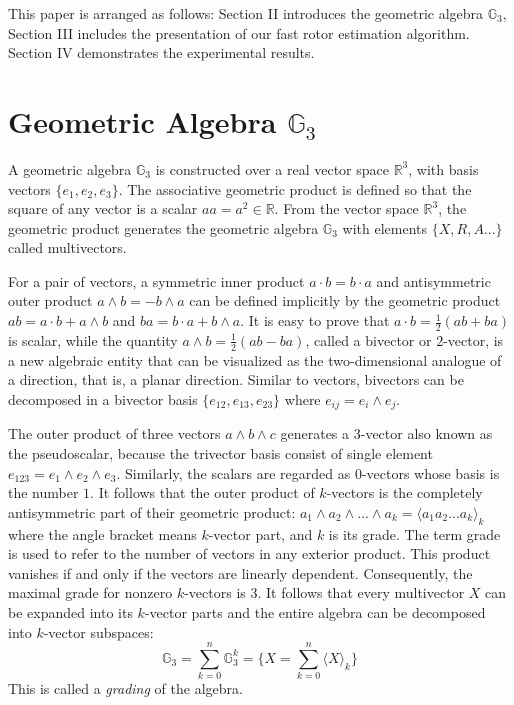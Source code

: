 \documentclass{birkjour}
\numberwithin{equation}{section}
\begin{document}
\indent This paper is arranged as follows: Section II introduces the geometric algebra $\mathbb{G}_3$, Section III includes the presentation of our fast rotor estimation algorithm. Section IV demonstrates the experimental results.

\section{Geometric Algebra $\mathbb{G}_3$}

A geometric algebra $\mathbb{G}_3$ is constructed over a real vector space $\mathbb R^3$, with basis vectors $\{e_1, e_2, e_3\}$. The associative geometric product is defined so that the square of any vector is a scalar $a a = a^2 \in \mathbb{R}$. From the vector space $\mathbb R^3$, the geometric product generates the geometric algebra $\mathbb{G}_3$ with elements $\{ X, R, A...\}$ called multivectors.

For a pair of vectors, a symmetric inner product $a \cdot b = b \cdot a$ and antisymmetric outer product $a \wedge b = -b \wedge a$ can be defined implicitly by the geometric product $a b = a \cdot b + a \wedge b$ and $b a = b \cdot a + b \wedge a$. It is easy to prove that $a \cdot b = \frac{1}{2}(a b + b a)$ is scalar, while the quantity $a \wedge b = \frac{1}{2}(a b - b a)$, called a bivector or $2$-vector, is a new algebraic entity that can be visualized as the two-dimensional analogue of a direction, that is, a planar direction. Similar to vectors, bivectors can be decomposed in a bivector basis $\{ e_{12}, e_{13}, e_{23} \}$ where $e_{ij} = e_i \wedge e_j$.

The outer product of three vectors $a \wedge b \wedge c$ generates a $3$-vector also known as the pseudoscalar, because the trivector basis consist of single element $e_{123} = e_1 \wedge e_2 \wedge e_3$. Similarly, the scalars are regarded as $0$-vectors whose basis is the number $1$. It follows that the outer product of $k$-vectors is the completely antisymmetric part of their geometric product: $a_1 \wedge a_2 \wedge ... \wedge a_k = \langle a_1 a_2 ... a_k \rangle_k$ where the angle bracket means $k$-vector part, and $k$ is its grade. The term grade is used to refer to the number of vectors in any exterior product. This product vanishes if and only if the vectors are linearly dependent. Consequently, the maximal grade for nonzero $k$-vectors is $3$. It follows that every multivector $X$ can be expanded into its $k$-vector parts and the entire algebra can be decomposed into $k$-vector subspaces:
\begin{equation*}
\mathbb G_3 = \sum_{k=0}^n{\mathbb{G}^k_3} = \{ X = \sum_{k=0}^n { \langle X \rangle_k } \}
\end{equation*}
This is called a \emph{grading} of the algebra. 
\end{document}
